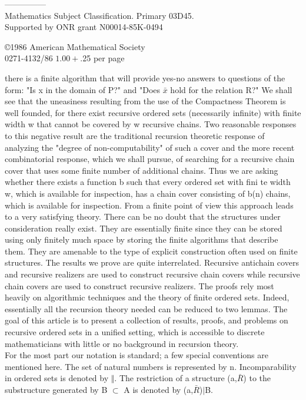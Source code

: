 \documentclass[twoside]{article}
\begin{document}
---------------\\
 Mathematics Subject Classification. Primary 03D45.\\
\indent Supported by ONR grant N00014-85K-0494
\newline
\begin{flushright}
\copyright 1986 American Mathematical Society\\ 0271-4132/86 $1.00 + $.25 per page
\end{flushright}
\onehalfspacing
\newpage
\addtolength{\voffset}{1.5cm}
\noindent there is a finite algorithm that will provide yes-no answers to questions of the form:  "Is    x    in the domain of    P?" and "Does $\bar{x}$    hold for the relation R?"  We shall see that the uneasiness resulting from the use of the Compactness Theorem is well founded,  for there exist recursive ordered sets (necessarily infinite) with finite width   w   that   cannot be covered by w recursive chains.    
Two reasonable responses to this negative result are the traditional recursion theoretic response of analyzing the "degree of non-computability" of such a cover and the more recent combinatorial response, which we shall pursue, of searching for a recursive chain cover that uses some finite number of additional chains. 
Thus we are asking whether there exists a function b such that every ordered set with fini te width w, which is available for inspection, has a chain cover consisting of b(n) chains, which is available for inspection. 
From a finite point of view this approach leads to a very satisfying theory. 
There can be no doubt that the structures under consideration really exist. 
They are essentially finite since they can be stored using only finitely much space by storing the finite algorithms that describe them.    
They are amenable to the type of explicit construction often used on finite structures.    
The results we prove are quite interrelated. Recursive antichain covers and recursive realizers are used to construct recursive chain covers while recursive chain covers are used to construct recursive realizers.
The proofs rely most heavily on algorithmic techniques and the theory of finite ordered sets.    
Indeed, essentially all the recursion theory needed can be reduced to two lemmas. 
The goal of this article is to present a collection of results, proofs, and problems on recursive ordered sets in a unified setting, which is accessible to discrete mathematicians with little or no background in recursion theory.\\
\newline
For the most part our notation is standard; a few special conventions are mentioned here. The set of natural numbers is represented by n. 
Incomparability in ordered sets is denoted by $\Vert$. The restriction of a structure (a,$\bar{R}$) to the substructure generated by B $\subset$ A is denoted by (a,$\bar{R}$)$\vert$B.\\
\end{document}

